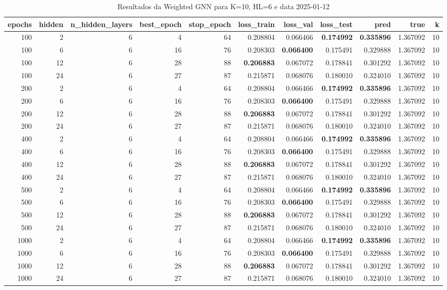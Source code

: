 \begin{table}
\caption{Resultados da Weighted GNN para K=10, HL=6 e data 2025-01-12}
\label{tab:weighted_gnn_results_k10_hl6_d20250112}
\begin{tabular}{rrrrrrrrrrr}
\toprule
epochs & hidden & n\_hidden\_layers & best\_epoch & stop\_epoch & loss\_train & loss\_val & loss\_test & pred & true & k \\
\midrule
100 & 2 & 6 & 4 & 64 & 0.208804 & 0.066466 & \textbf{0.174992} & \textbf{0.335896} & 1.367092 & 10 \\
100 & 6 & 6 & 16 & 76 & 0.208303 & \textbf{0.066400} & 0.175491 & 0.329888 & 1.367092 & 10 \\
100 & 12 & 6 & 28 & 88 & \textbf{0.206883} & 0.067072 & 0.178841 & 0.301292 & 1.367092 & 10 \\
100 & 24 & 6 & 27 & 87 & 0.215871 & 0.068076 & 0.180010 & 0.324010 & 1.367092 & 10 \\
200 & 2 & 6 & 4 & 64 & 0.208804 & 0.066466 & \textbf{0.174992} & \textbf{0.335896} & 1.367092 & 10 \\
200 & 6 & 6 & 16 & 76 & 0.208303 & \textbf{0.066400} & 0.175491 & 0.329888 & 1.367092 & 10 \\
200 & 12 & 6 & 28 & 88 & \textbf{0.206883} & 0.067072 & 0.178841 & 0.301292 & 1.367092 & 10 \\
200 & 24 & 6 & 27 & 87 & 0.215871 & 0.068076 & 0.180010 & 0.324010 & 1.367092 & 10 \\
400 & 2 & 6 & 4 & 64 & 0.208804 & 0.066466 & \textbf{0.174992} & \textbf{0.335896} & 1.367092 & 10 \\
400 & 6 & 6 & 16 & 76 & 0.208303 & \textbf{0.066400} & 0.175491 & 0.329888 & 1.367092 & 10 \\
400 & 12 & 6 & 28 & 88 & \textbf{0.206883} & 0.067072 & 0.178841 & 0.301292 & 1.367092 & 10 \\
400 & 24 & 6 & 27 & 87 & 0.215871 & 0.068076 & 0.180010 & 0.324010 & 1.367092 & 10 \\
500 & 2 & 6 & 4 & 64 & 0.208804 & 0.066466 & \textbf{0.174992} & \textbf{0.335896} & 1.367092 & 10 \\
500 & 6 & 6 & 16 & 76 & 0.208303 & \textbf{0.066400} & 0.175491 & 0.329888 & 1.367092 & 10 \\
500 & 12 & 6 & 28 & 88 & \textbf{0.206883} & 0.067072 & 0.178841 & 0.301292 & 1.367092 & 10 \\
500 & 24 & 6 & 27 & 87 & 0.215871 & 0.068076 & 0.180010 & 0.324010 & 1.367092 & 10 \\
1000 & 2 & 6 & 4 & 64 & 0.208804 & 0.066466 & \textbf{0.174992} & \textbf{0.335896} & 1.367092 & 10 \\
1000 & 6 & 6 & 16 & 76 & 0.208303 & \textbf{0.066400} & 0.175491 & 0.329888 & 1.367092 & 10 \\
1000 & 12 & 6 & 28 & 88 & \textbf{0.206883} & 0.067072 & 0.178841 & 0.301292 & 1.367092 & 10 \\
1000 & 24 & 6 & 27 & 87 & 0.215871 & 0.068076 & 0.180010 & 0.324010 & 1.367092 & 10 \\
\bottomrule
\end{tabular}
\end{table}

